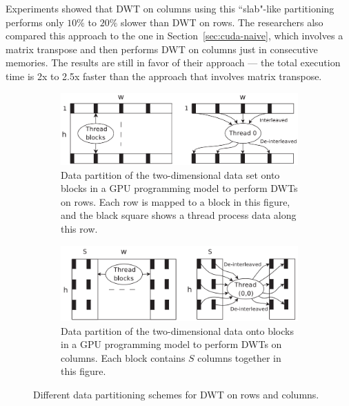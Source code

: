 Experiments showed that DWT on columns using this ``slab"-like 
partitioning performs only $10\%$ to $20\%$ slower than DWT on rows.
%
The researchers also compared this approach to the one in 
Section~\ref{sec:cuda-naive}, which involves a matrix transpose
and then performs DWT on columns just in consecutive memories.
%
The results are still in favor of their approach --- the total
execution time is 2x to 2.5x faster than the approach that involves
matrix transpose.

\begin{figure}
    \centering
    \begin{subfigure}[b]{0.85\textwidth}
                \includegraphics[width=\textwidth]{fig/row.png}
                \caption{
                Data partition of the two-dimensional data set onto 
                blocks in a GPU programming model to perform DWTs on rows.
                Each row is mapped to a block in this figure, and the black
                square shows a thread process data along this row. 
                }
                \label{fig:cuda-row}
        \end{subfigure}
\quad
    \begin{subfigure}[b]{0.85\textwidth}
        \includegraphics[width=\textwidth]{fig/column.png}
        \caption{
                Data partition of the two-dimensional data onto 
                blocks in a GPU programming model to perform DWTs on columns.
                Each block contains $S$ columns together in this figure.
                }
        \label{fig:cuda-column}
    \end{subfigure}
%
    \caption{Different data partitioning schemes for DWT on rows and columns.}
\end{figure}





